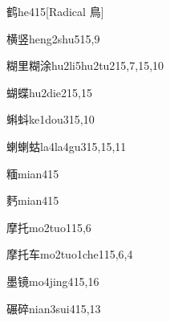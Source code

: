\begin{verbete}{鹤}{he4}{15}[Radical 鳥]
\end{verbete}

\begin{verbete}{横竖}{heng2shu5}{15,9}
\end{verbete}

\begin{verbete}{糊里糊涂}{hu2li5hu2tu2}{15,7,15,10}
\end{verbete}

\begin{verbete}{蝴蝶}{hu2die2}{15,15}
\end{verbete}

\begin{verbete}{蝌蚪}{ke1dou3}{15,10}
\end{verbete}

\begin{verbete}{蝲蝲蛄}{la4la4gu3}{15,15,11}
\end{verbete}

\begin{verbete}{糆}{mian4}{15}
\end{verbete}

\begin{verbete}{麫}{mian4}{15}
\end{verbete}

\begin{verbete}{摩托}{mo2tuo1}{15,6}
\end{verbete}

\begin{verbete}{摩托车}{mo2tuo1che1}{15,6,4}
\end{verbete}

\begin{verbete}{墨镜}{mo4jing4}{15,16}
\end{verbete}

\begin{verbete}{碾碎}{nian3sui4}{15,13}
\end{verbete}


